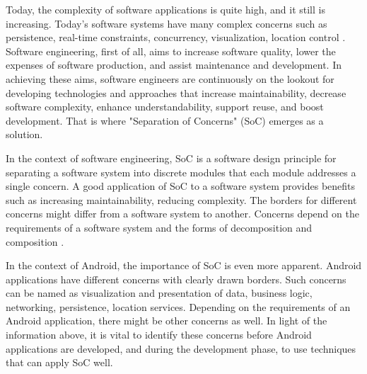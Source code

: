 Today, the complexity of software applications is quite high, and it still is increasing. Today's software systems have many complex concerns such as persistence, real-time constraints, concurrency, visualization, location control \cite{27}. Software engineering, first of all, aims to increase software quality, lower the expenses of software production, and assist maintenance and development. In achieving these aims, software engineers are continuously on the lookout for developing technologies and approaches that increase maintainability, decrease software complexity, enhance understandability, support reuse, and boost development. That is where "Separation of Concerns" (SoC) emerges as a solution. 

In the context of software engineering, SoC is a software design principle for separating a software system into discrete modules that each module addresses a single concern. A good application of SoC to a software system provides benefits such as increasing maintainability, reducing complexity. The borders for different concerns might differ from a software system to another. Concerns depend on the requirements of a software system and the forms of decomposition and composition \cite{28}. 

In the context of Android, the importance of SoC is even more apparent. Android applications have different concerns with clearly drawn borders. Such concerns can be named as visualization and presentation of data, business logic, networking, persistence, location services. Depending on the requirements of an Android application, there might be other concerns as well. In light of the information above, it is vital to identify these concerns before Android applications are developed, and during the development phase, to use techniques that can apply SoC well.